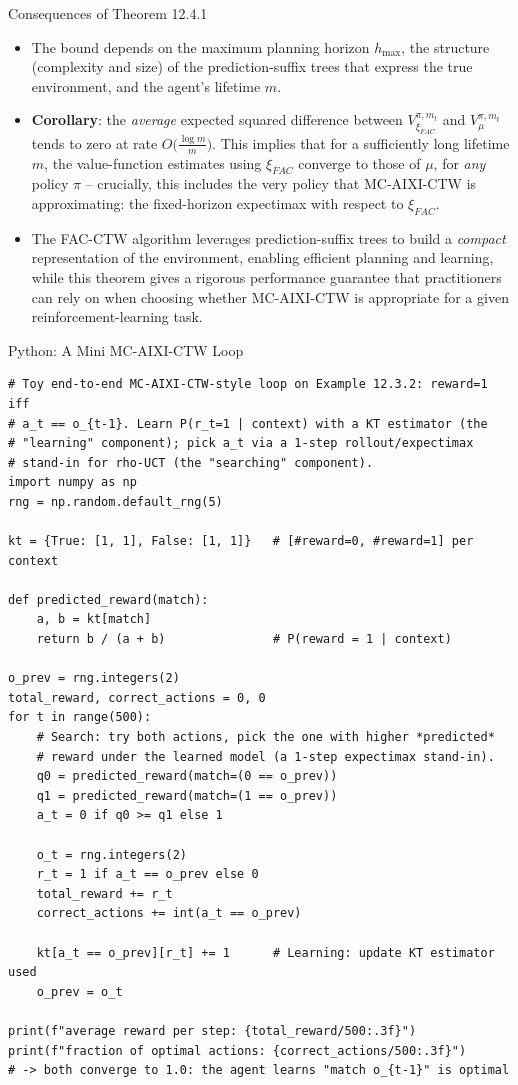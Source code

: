 \documentclass[aspectratio=169,10pt]{beamer}
\begin{document}
\begin{frame}{Consequences of Theorem 12.4.1}
\begin{itemize}
\item The bound depends on the maximum planning horizon $h_{\max}$, the structure
(complexity and size) of the prediction-suffix trees that express the true environment,
and the agent's lifetime $m$.
\item \textbf{Corollary}: the \emph{average} expected squared difference between
$V_{\xi_{FAC}}^{\pi,m_t}$ and $V_\mu^{\pi,m_t}$ tends to zero at rate
$O\!\big(\tfrac{\log m}{m}\big)$. This implies that for a sufficiently long lifetime $m$,
the value-function estimates using $\xi_{FAC}$ converge to those of $\mu$, for \emph{any}
policy $\pi$ -- crucially, this includes the very policy that MC-AIXI-CTW is
approximating: the fixed-horizon expectimax with respect to $\xi_{FAC}$.
\item The FAC-CTW algorithm leverages prediction-suffix trees to build a \emph{compact}
representation of the environment, enabling efficient planning and learning, while this
theorem gives a rigorous performance guarantee that practitioners can rely on when
choosing whether MC-AIXI-CTW is appropriate for a given reinforcement-learning task.
\end{itemize}
\end{frame}

\begin{frame}[fragile]{Python: A Mini MC-AIXI-CTW Loop}
\vspace{-0.1cm}
{\lstset{basicstyle=\ttfamily\tiny}
\begin{lstlisting}
# Toy end-to-end MC-AIXI-CTW-style loop on Example 12.3.2: reward=1 iff
# a_t == o_{t-1}. Learn P(r_t=1 | context) with a KT estimator (the
# "learning" component); pick a_t via a 1-step rollout/expectimax
# stand-in for rho-UCT (the "searching" component).
import numpy as np
rng = np.random.default_rng(5)

kt = {True: [1, 1], False: [1, 1]}   # [#reward=0, #reward=1] per context

def predicted_reward(match):
    a, b = kt[match]
    return b / (a + b)               # P(reward = 1 | context)

o_prev = rng.integers(2)
total_reward, correct_actions = 0, 0
for t in range(500):
    # Search: try both actions, pick the one with higher *predicted*
    # reward under the learned model (a 1-step expectimax stand-in).
    q0 = predicted_reward(match=(0 == o_prev))
    q1 = predicted_reward(match=(1 == o_prev))
    a_t = 0 if q0 >= q1 else 1

    o_t = rng.integers(2)
    r_t = 1 if a_t == o_prev else 0
    total_reward += r_t
    correct_actions += int(a_t == o_prev)

    kt[a_t == o_prev][r_t] += 1      # Learning: update KT estimator used
    o_prev = o_t

print(f"average reward per step: {total_reward/500:.3f}")
print(f"fraction of optimal actions: {correct_actions/500:.3f}")
# -> both converge to 1.0: the agent learns "match o_{t-1}" is optimal
\end{lstlisting}}
\end{frame}
\end{document}
